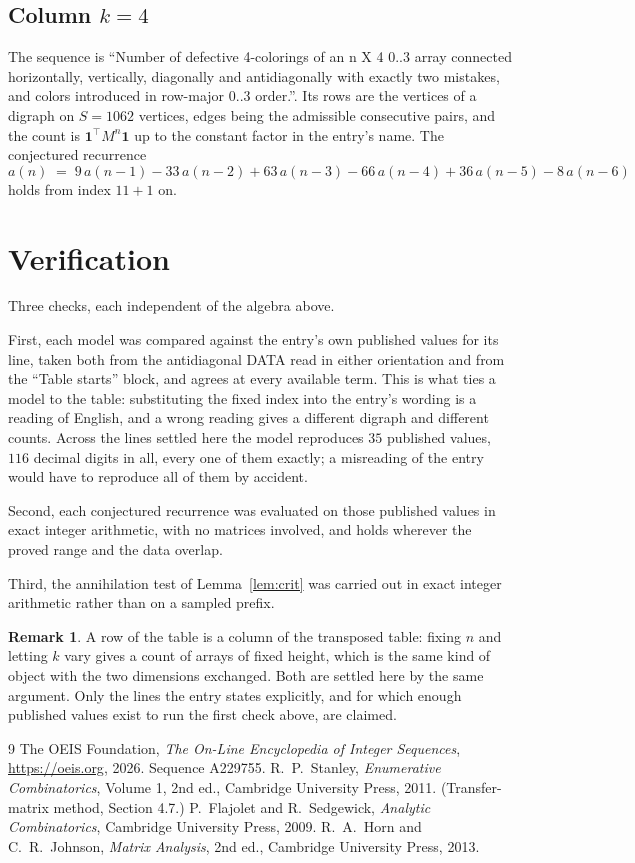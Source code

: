 \documentclass[11pt,a4paper]{article}
\theoremstyle{plain}
\theoremstyle{definition}
\newtheorem{remark}[theorem]{Remark}
\begin{document}
\subsection*{Column $k$$=4$}
The sequence is ``Number of defective 4-colorings of an n X 4 0..3 array connected horizontally, vertically, diagonally and antidiagonally with exactly two mistakes, and colors introduced in row-major 0..3 order.''. Its rows are the vertices of a digraph on
$S=1062$ vertices, edges being the admissible consecutive pairs, and the count is
$\mathbf{1}^{\!\top}M^{n}\mathbf{1}$ up to the constant factor in the entry's name.
The conjectured recurrence
\[
a(n)\;=\;9\,a(n-1) - 33\,a(n-2) + 63\,a(n-3) - 66\,a(n-4) + 36\,a(n-5) - 8\,a(n-6)
\]
holds from index $11+1$ on.

\section{Verification}

Three checks, each independent of the algebra above.

First, each model was compared against the entry's own published values for its line, taken
both from the antidiagonal DATA read in either orientation and from the ``Table starts''
block, and agrees at every available term. This is what ties a model to the table:
substituting the fixed index into the entry's wording is a reading of English, and a wrong
reading gives a different digraph and different counts. Across the lines settled here the
model reproduces $35$ published values, $116$ decimal digits in all, every one of
them exactly; a misreading of the entry would have to reproduce all of them by accident.

Second, each conjectured recurrence was evaluated on those published values in exact
integer arithmetic, with no matrices involved, and holds wherever the proved range and the
data overlap.

Third, the annihilation test of Lemma~\ref{lem:crit} was carried out in exact integer
arithmetic rather than on a sampled prefix.

\begin{remark}
A row of the table is a column of the transposed table: fixing $n$ and letting $k$ vary gives a
count of arrays of fixed height, which is the same kind of object with the two dimensions
exchanged. Both are settled here by the same argument. Only the lines the entry states
explicitly, and for which enough published values exist to run the first check above, are
claimed.
\end{remark}

\begin{thebibliography}{9}
 The OEIS Foundation, \emph{The On-Line Encyclopedia of Integer
Sequences}, \url{https://oeis.org}, 2026. Sequence A229755.
 R.~P.~Stanley, \emph{Enumerative Combinatorics}, Volume 1, 2nd ed.,
Cambridge University Press, 2011. (Transfer-matrix method, Section 4.7.)
 P.~Flajolet and R.~Sedgewick, \emph{Analytic Combinatorics}, Cambridge
University Press, 2009.
 R.~A.~Horn and C.~R.~Johnson, \emph{Matrix Analysis}, 2nd ed., Cambridge
University Press, 2013.
\end{thebibliography}
\end{document}
